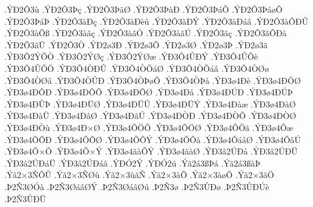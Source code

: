{.^^dd^^d02^^d43^^f9
.^^dd^^d02^^d43^^de^^e7
.^^dd^^d02^^d43^^de^^e4^^d8
.^^dd^^d02^^d43^^de^^e0^^d0
.^^dd^^d02^^d43^^de^^e1^^d5
.^^dd^^d02^^d43^^de^^e1^^f8^^d5
.^^dd^^d02^^d43^^de^^e1^^de
.^^dd^^d02^^d43^^e0^^d0^^e7
.^^dd^^d02^^d43^^e0^^d0^^e8^^fb
.^^dd^^d02^^d43^^e0^^d0^^dd
.^^dd^^d02^^d43^^e0^^d0^^e1^^e2
.^^dd^^d02^^d43^^e0^^d5^^d0^^db
.^^dd^^d02^^d43^^e0^^d5^^df
.^^dd^^d02^^d43^^e0^^e3^^e7
.^^dd^^d02^^d43^^e0^^e3^^d3
.^^dd^^d02^^d43^^e0^^e3^^da
.^^dd^^d02^^d43^^e3^^e7
.^^dd^^d02^^d43^^e3^^d4^^d0^^e0
.^^dd^^d02^^d43^^e3^^dc
.^^dd^^d02^^d43^^d2
.^^dd^^d02^^f83^^d0
.^^dd^^d02^^f83^^d5
.^^dd^^d02^^f83^^d8
.^^dd^^d02^^f83^^de
.^^dd^^d02^^f83^^e3
.^^dd^^d03^^d42^^dd^^d5^^d2
.^^dd^^d03^^d42^^dd^^d8^^e7
.^^dd^^d03^^d42^^dd^^d8^^e6
.^^dd^^d03^^d44^^db^^d0^^dd
.^^dd^^d03^^d44^^db^^d5^^e8
.^^dd^^d03^^d44^^db^^d5^^d6
.^^dd^^d03^^d44^^d2^^d0^^db
.^^dd^^d03^^d44^^d2^^d5^^e1^^d8
.^^dd^^d03^^d44^^d2^^d5^^e1^^e2
.^^dd^^d03^^d44^^d2^^d8^^f8
.^^dd^^d03^^d44^^d2^^d8^^e2
.^^dd^^d03^^d44^^d2^^db^^d0
.^^dd^^d03^^d44^^d2^^de^^f8^^d5
.^^dd^^d03^^d44^^d2^^de^^e0
.^^dd^^d03^^f84^^d0^^e8
.^^dd^^d03^^f84^^d0^^d6^^d8
.^^dd^^d03^^f84^^d0^^d4^^d0
.^^dd^^d03^^f84^^d0^^d4^^d5
.^^dd^^d03^^f84^^d0^^d4^^d8
.^^dd^^d03^^f84^^d0^^e5
.^^dd^^d03^^f84^^d0^^da^^d0
.^^dd^^d03^^f84^^d0^^da^^de
.^^dd^^d03^^f84^^d0^^db^^de
.^^dd^^d03^^f84^^d0^^dc^^d8
.^^dd^^d03^^f84^^d0^^dc^^db
.^^dd^^d03^^f84^^d0^^dc^^dd
.^^dd^^d03^^f84^^d0^^e0^^e6
.^^dd^^d03^^f84^^d0^^e0^^d8
.^^dd^^d03^^f84^^d0^^e0^^dc
.^^dd^^d03^^f84^^d0^^e2^^d8
.^^dd^^d03^^f84^^d0^^e3^^da
.^^dd^^d03^^f84^^d0^^d2^^d0
.^^dd^^d03^^f84^^d0^^d2^^d5
.^^dd^^d03^^f84^^d0^^d2^^d8
.^^dd^^d03^^f84^^d0^^d2^^f9
.^^dd^^d03^^f84^^d0^^d7^^d8
.^^dd^^d03^^f84^^d5^^d6^^d5
.^^dd^^d03^^f84^^d5^^d6^^d8
.^^dd^^d03^^f84^^d5^^d6^^e3
.^^dd^^d03^^f84^^d5^^e6
.^^dd^^d03^^f84^^d5^^d4^^d0
.^^dd^^d03^^f84^^d5^^d4^^d8
.^^dd^^d03^^f84^^d5^^d4^^dd
.^^dd^^d03^^f84^^d5^^d4^^e0
.^^dd^^d03^^f84^^d5^^e1^^e2^^d8
.^^dd^^d03^^f84^^d5^^e2^^da
.^^dd^^d03^^f84^^d5^^d7^^d4
.^^dd^^d03^^f84^^d5^^d7^^dd
.^^dd^^d03^^f84^^e3^^e0^^d5^^dd
.^^dd^^d03^^f84^^e3^^e0^^d8
.^^dd^^d03^^e22^^da^^d0^^e5
.^^dd^^d03^^e22^^da^^d0^^dc
.^^dd^^d03^^e22^^da^^d0^^e1^^dc
.^^dd^^d03^^e22^^da^^d0^^e1^^e2
.^^dd^^d0^^d32^^dd
.^^dd^^d0^^d32^^fa
.^^dd^^e32^^e13^^df^^de^^e1
.^^dd^^e32^^e13^^df^^e0^^de
.^^dd^^e32^^d73^^d1^^d5^^db
.^^dd^^e32^^d73^^d1^^d8^^f9
.^^dd^^e32^^d73^^f9^^e3^^d1
.^^dd^^e32^^d73^^e0^^d5
.^^dd^^e32^^d73^^e0^^f8^^d5
.^^dd^^e32^^d73^^e3^^d6
.^^de2^^d13^^d8^^d3^^e0
.^^de2^^d13^^d8^^e1^^e2^^d8^^dd
.^^de2^^d13^^d8^^e1^^e2^^d8^^fa
.^^de2^^d13^^f8
.^^de2^^d13^^db^^d0^^f8
.^^de2^^d13^^db^^d0^^da^^e8
.^^de2^^d13^^db^^d0^^dc
}
